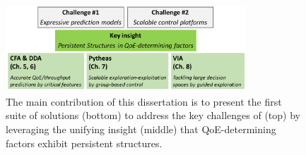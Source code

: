 
\begin{figure}[t!]
\centering
\includegraphics[width=0.8\textwidth]{figures/intro-contribution.pdf}
\caption{The main contribution of this dissertation is to present the first suite of 
solutions (bottom) to address the key challenges of \ddn (top) by leveraging the 
unifying insight (middle) that QoE-determining factors exhibit persistent structures.}
\label{fig:intro-contribution}
\end{figure}


